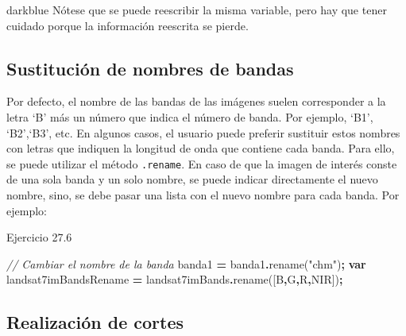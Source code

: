 \documentclass[
  12pt,
  letterpaper,
  twoside]{book}
\newenvironment{Shaded}{\begin{snugshade}}{\end{snugshade}}
\newcommand{\CommentTok}[1]{\textcolor[rgb]{0.56,0.35,0.01}{\textit{#1}}}
\newcommand{\FunctionTok}[1]{\textcolor[rgb]{0.00,0.00,0.00}{#1}}
\newcommand{\KeywordTok}[1]{\textcolor[rgb]{0.13,0.29,0.53}{\textbf{#1}}}
\newcommand{\NormalTok}[1]{#1}
\newcommand{\OperatorTok}[1]{\textcolor[rgb]{0.81,0.36,0.00}{\textbf{#1}}}
\newcommand{\StringTok}[1]{\textcolor[rgb]{0.31,0.60,0.02}{#1}}
\begin{document}
\begin{bluebox2}

\begin{awesomeblock}{5pt}{\faLightbulb}{darkblue}
Nótese que se puede reescribir la misma variable, pero hay que tener cuidado porque la información reescrita se pierde.

\end{awesomeblock}

\end{bluebox2}

\hypertarget{sustituciuxf3n-de-nombres-de-bandas}{%
\subsection{Sustitución de nombres de bandas}\label{sustituciuxf3n-de-nombres-de-bandas}}

Por defecto, el nombre de las bandas de las imágenes suelen corresponder a la letra `B' más un número que indica el número de banda. Por ejemplo, `B1', `B2',`B3', etc. En algunos casos, el usuario puede preferir sustituir estos nombres con letras que indiquen la longitud de onda que contiene cada banda. Para ello, se puede utilizar el método \texttt{.rename}. En caso de que la imagen de interés conste de una sola banda y un solo nombre, se puede indicar directamente el nuevo nombre, sino, se debe pasar una lista con el nuevo nombre para cada banda. Por ejemplo:

Ejercicio 27.6

\begin{Shaded}
\begin{Highlighting}[]
\CommentTok{// Cambiar el nombre de la banda }
\NormalTok{banda1 }\OperatorTok{=}\NormalTok{ banda1}\OperatorTok{.}\FunctionTok{rename}\NormalTok{(}\StringTok{"chm"}\NormalTok{)}\OperatorTok{;}
\KeywordTok{var}\NormalTok{ landsat7imBandsRename }\OperatorTok{=}\NormalTok{ landsat7imBands}\OperatorTok{.}\FunctionTok{rename}\NormalTok{([}\StringTok{\textquotesingle{}B\textquotesingle{}}\OperatorTok{,}\StringTok{\textquotesingle{}G\textquotesingle{}}\OperatorTok{,}\StringTok{\textquotesingle{}R\textquotesingle{}}\OperatorTok{,}\StringTok{\textquotesingle{}NIR\textquotesingle{}}\NormalTok{])}\OperatorTok{;}
\end{Highlighting}
\end{Shaded}

\hypertarget{realizaciuxf3n-de-cortes}{%
\subsection{Realización de cortes}\label{realizaciuxf3n-de-cortes}}
\end{document}
